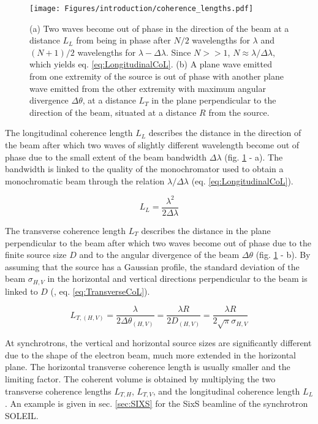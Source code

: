 \begin{figure}[!htb]
    \centering
    \texttt{[image: Figures/introduction/coherence\_lengths.pdf]}
    \caption{
    (a) Two waves become out of phase in the direction of the beam at a distance $L_L$ from being in phase after $N/2$ wavelengths for $\lambda$ and $(N+1)/2$ wavelengths for $\lambda - \Delta\lambda$. Since $N >> 1$, $N\approx\lambda/\Delta\lambda$, which yields eq. \ref{eq:LongitudinalCoL}.
    (b) A plane wave emitted from one extremity of the source is out of phase with another plane wave emitted from the other extremity with maximum angular divergence $\Delta\theta$, at a distance $L_T$ in the plane perpendicular to the direction of the beam, situated at a distance $R$ from the source.
    }
    \label{fig:CoherenceLengths}
\end{figure}

The longitudinal coherence length $L_L$ describes the distance in the direction of the beam after which two waves of slightly different wavelength become out of phase due to the small extent of the beam bandwidth $\Delta\lambda$ (fig. \ref{fig:CoherenceLengths} - a).
The bandwidth is linked to the quality of the monochromator used to obtain a monochromatic beam through the relation $\lambda/\Delta\lambda$ (eq. \ref{eq:LongitudinalCoL}).

\begin{equation}
    \label{eq:LongitudinalCoL}
    L_L = \frac{\lambda^2}{2\Delta\lambda}
\end{equation}

The transverse coherence length $L_T$ describes the distance in the plane perpendicular to the beam after which two waves become out of phase due to the finite source size $D$ and to the angular divergence of the beam $\Delta\theta$ (fig. \ref{fig:CoherenceLengths} - b).
By assuming that the source has a Gaussian profile, the standard deviation of the beam $\sigma_{H, V}$ in the horizontal and vertical directions perpendicular to the beam is linked to $D$ (\cite{Willmott}, eq. \ref{eq:TransverseCoL}).

\begin{equation}
    \label{eq:TransverseCoL}
    L_{T,(H, V)} = \frac{\lambda}{2\Delta\theta_{(H, V)}} = \frac{\lambda R}{2 D_{(H, V)}} = \frac{\lambda R}{2\sqrt{\pi}\sigma_{H, V}}
\end{equation}

At synchrotrons, the vertical and horizontal source sizes are significantly different due to the shape of the electron beam, much more extended in the horizontal plane.
The horizontal transverse coherence length is usually smaller and the limiting factor.
The coherent volume is obtained by multiplying the two transverse coherence lengths $L_{T,H}$, $L_{T,V}$, and the longitudinal coherence length $L_L$.
An example is given in sec. \ref{sec:SIXS} for the SixS beamline of the synchrotron SOLEIL.

